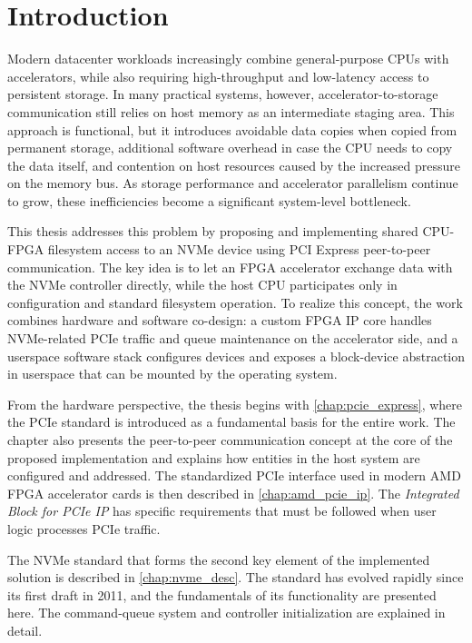 \chapter*{Introduction}
{}

Modern datacenter workloads increasingly combine general-purpose CPUs with accelerators, while also
requiring high-throughput and low-latency access to persistent storage. In many practical systems,
however, accelerator-to-storage communication still relies on host memory as an intermediate staging
area. This approach is functional, but it introduces avoidable data copies when copied from
permanent storage, additional software overhead in case the CPU needs to copy the data itself, and
contention on host resources caused by the increased pressure on the memory bus. As storage
performance and accelerator parallelism continue to grow, these inefficiencies become a significant
system-level bottleneck.

This thesis addresses this problem by proposing and implementing shared CPU-FPGA filesystem access
to an NVMe device using PCI Express peer-to-peer communication. The key idea is to let an FPGA
accelerator exchange data with the NVMe controller directly, while the host CPU participates only
in configuration and standard filesystem operation. To realize this concept, the work combines
hardware and software co-design: a custom FPGA IP core handles NVMe-related PCIe traffic and queue
maintenance on the accelerator side, and a userspace software stack configures devices and exposes a
block-device abstraction in userspace that can be mounted by the operating system.

From the hardware perspective, the thesis begins with \cref{chap:pcie_express}, where the PCIe
standard is introduced as a fundamental basis for the entire work. The chapter also presents the
peer-to-peer communication concept at the core of the proposed implementation and explains how
entities in the host system are configured and addressed. The standardized PCIe interface used in
modern AMD FPGA accelerator cards is then described in \cref{chap:amd_pcie_ip}. The
\emph{Integrated Block for PCIe IP} has specific requirements that must be followed when user logic
processes PCIe traffic.

The NVMe standard that forms the second key element of the implemented solution is described in
\cref{chap:nvme_desc}. The standard has evolved rapidly since its first draft in 2011, and the
fundamentals of its functionality are presented here. The command-queue system and controller
initialization are explained in detail.

